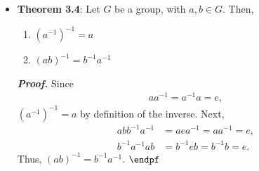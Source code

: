 \documentclass{report}
\begin{document}
\begin{itemize}
            \textbf{\textit{Proof.}} We proceed by strong induction upon $n$. If $n$ is 1 or 2, no bracketing is needed. If $n=3$, we have associativity from the definition of a group. So, let $n \geq 4$. Assume that the theorem is true for any product of fewer than $n$ group elements.
            \bigbreak \noindent 
            Let
            \begin{align*}
                w = a_{1} \cdots a_{n}
            \end{align*}
            be a product with any bracketing configuration. Then, let
            \begin{align*}
                 w =xy
            \end{align*}
            for $x = a_{1} \cdots a_{m}$, $y = a_{m+1} \cdots a_{n} $, each with some bracketing. By the inductive hypothesis,
            \begin{align*}
                x &= (\cdots((a_{1}a_{2})a_{3})\cdots a_{m-1})a_{m}, \\
                y &= (\cdots((a_{m+1}a_{m+2})a_{m+3})\cdots a_{n-1})a_{n}
            .\end{align*}
            So,
            \begin{align*}
                w = xy =  ((\cdots((a_{1}a_{2})a_{3})\cdots a_{m})(\cdots((a_{m+1}a_{m+2})a_{m+3})\cdots a_{n-1}))a_{n}
            .\end{align*}
            Applying our inductive hypothesis to the product of the first $n-1$ terms, we obtain the desired bracketing. $\endpf$
        \item \textbf{Theorem 3.4}: Let $G$ be a group, with $a,b \in G$. Then, 
            \begin{enumerate}
                \item $(a^{-1})^{-1}= a $
                \item $(ab)^{-1} = b^{-1}a^{-1} $
            \end{enumerate}
            \textbf{\textit{Proof.}} Since
            \begin{align*}
                aa^{-1} = a^{-1}a = e
            ,\end{align*}
            $(a^{-1})^{-1}  = a$ by definition of the inverse. Next,
            \begin{align*}
                abb^{-1}a^{-1} &= aea^{-1} = aa^{-1} = e, \\
                b^{-1}a^{-1}ab &= b^{-1}eb = b^{-1}b = e
            .\end{align*}
            Thus, $(ab)^{-1} = b^{-1}a^{-1}$. $\endpf$

\end{itemize}
\end{document}
